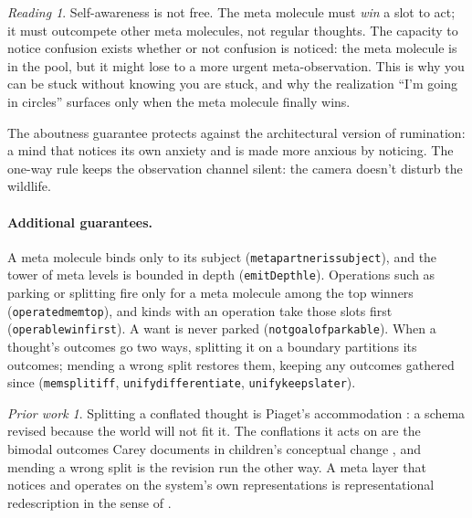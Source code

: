 \documentclass[11pt]{article}
\newcommand{\leanus}{\textunderscore\allowbreak}
\newcommand{\lean}[1]{{\let\_\leanus\texttt{#1}}}
\theoremstyle{remark}
\newtheorem*{reading}{Reading}
\newtheorem*{prior}{Prior work}
\begin{document}
\begin{reading}
Self-awareness is not free. The meta molecule must \emph{win} a slot to act; it must
outcompete other meta molecules, not regular thoughts. The capacity to notice confusion
exists whether or not confusion is noticed: the meta molecule is in the pool, but it might
lose to a more urgent meta-observation. This is why you can be stuck without knowing you
are stuck, and why the realization ``I'm going in circles'' surfaces only when the meta
molecule finally wins.

The aboutness guarantee protects against the architectural version of rumination: a mind
that notices its own anxiety and is made more anxious by noticing. The one-way rule keeps
the observation channel silent: the camera doesn't disturb the wildlife.
\end{reading}

\paragraph{Additional guarantees.} A meta molecule binds only to its subject
(\lean{meta\_partner\_is\_subject}), and the tower of meta levels is bounded in depth
(\lean{emitDepth\_le}). Operations such as parking or splitting fire only for a meta
molecule among the top winners (\lean{operated\_mem\_top}), and kinds with an operation
take those slots first (\lean{operable\_win\_first}). A want is never parked
(\lean{not\_goal\_of\_parkable}). When a thought's outcomes go two ways, splitting it on a
boundary partitions its outcomes; mending a wrong split restores them, keeping any outcomes
gathered since (\lean{mem\_split\_iff}, \lean{unify\_differentiate},
\lean{unify\_keeps\_later}).

\begin{prior}
Splitting a conflated thought is Piaget's accommodation \citep{Piaget1952}: a schema revised
because the world will not fit it. The conflations it acts on are the bimodal outcomes Carey
documents in children's conceptual change \citep{Carey1985}, and mending a wrong split is
the revision run the other way. A meta layer that notices and operates on the system's own
representations is representational redescription in the sense of
\citet{KarmiloffSmith1992}.
\end{prior}

\end{document}
